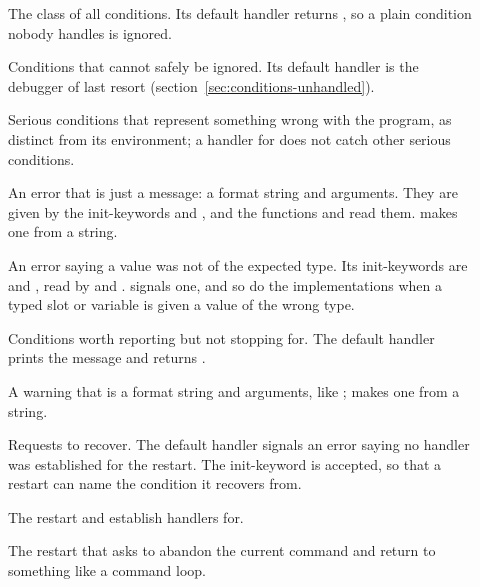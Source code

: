\begin{description}
\item[] The class of all conditions. Its default
  handler returns , so a plain condition nobody handles is
  ignored.
\item[] Conditions that cannot safely be
  ignored. Its default handler is the debugger of last resort
  (section~\ref{sec:conditions-unhandled}).
\item[] Serious conditions that represent something wrong
  with the program, as distinct from its environment; a handler for
   does not catch other serious conditions.
\item[] An error that is just a message: a format
  string and arguments. They are given by the init-keywords
   and , and the functions
   and
  read them.  makes one from a string.
\item[] An error saying a value was not of the
  expected type. Its init-keywords are  and ,
  read by  and
  .
   signals one, and so do the implementations when a
  typed slot or variable is given a value of the wrong type.
\item[] Conditions worth reporting but not stopping
  for. The default handler prints the message and returns .
\item[] A warning that is a format string and
  arguments, like ;  makes one from a
  string.
\item[] Requests to recover. The default handler signals
  an error saying no handler was established for the restart. The
  init-keyword  is accepted, so that a restart can name
  the condition it recovers from.
\item[] The restart  and
   establish handlers for.
\item[] The restart that asks to abandon the current
  command and return to something like a command loop.
\end{description}

